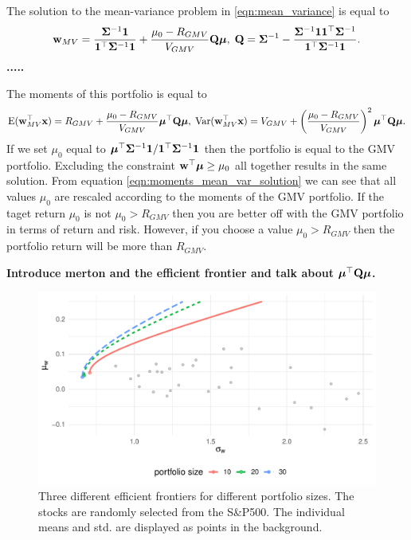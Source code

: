 \documentclass[]{book}\usepackage{knitr}
\begin{document}
The solution to the mean-variance problem in \eqref{eqn:mean_variance} is equal to
\begin{equation}\label{eqn:mean_var_solution}
	\mathbf{w}_{MV} = \frac{\mathbf{\Sigma}^{-1}\mathbf{1}}{\mathbf{1}^\top \mathbf{\Sigma}^{-1}\mathbf{1}} + \frac{\mu_0 - R_{GMV}}{V_{GMV}} \mathbf{Q} \mbox{\boldmath$\mu$},\; \mathbf{Q} = \mathbf{\Sigma}^{-1} - \frac{\mathbf{\Sigma}^{-1} \mathbf{1} \mathbf{1}^\top \mathbf{\Sigma}^{-1}}{\mathbf{1}^\top \mathbf{\Sigma}^{-1} \mathbf{1}}.
\end{equation}
\textbf{.....}

The moments of this portfolio is equal to
\begin{equation}\label{eqn:moments_mean_var_solution}
\operatorname{E}(\mathbf{w}_{MV}^\top\mathbf{x}) = R_{GMV} + \frac{\mu_0 - R_{GMV}}{V_{GMV}} \mbox{\boldmath$\mu$}^\top \mathbf{Q} \mbox{\boldmath$\mu$}, \;
\operatorname{Var}(\mathbf{w}_{MV}^\top\mathbf{x}) =V_{GMV} + \left(\frac{\mu_0 - R_{GMV}}{V_{GMV}}\right)^2 \mbox{\boldmath$\mu$}^\top \mathbf{Q} \mbox{\boldmath$\mu$}.
\end{equation}
If we set $\mu_0$ equal to $\mbox{\boldmath$\mu$}^\top \mathbf{\Sigma}^{-1} \mathbf{1} / \mathbf{1}^\top \mathbf{\Sigma}^{-1} \mathbf{1}$ then the portfolio is equal to the GMV portfolio. 
Excluding the constraint $\mathbf{w}^\top \mbox{\boldmath$\mu$} \geq \mu_0$ all together results in the same solution.
From equation \eqref{eqn:moments_mean_var_solution} we can see that all values $\mu_0$ are rescaled according to the moments of the GMV portfolio. 
If the taget return $\mu_0$ is not $\mu_0>R_{GMV}$ then you are better off with the GMV portfolio in terms of return and risk.
However, if you choose a value $\mu_0>R_{GMV}$ then the portfolio return will be more than $R_{GMV}$.

\textbf{Introduce merton and the efficient frontier and talk about $\mbox{\boldmath$\mu$}^\top \mathbf{Q} \mbox{\boldmath$\mu$}$.}
\begin{knitrout}
\color{fgcolor}\begin{figure}

{\centering \includegraphics[width=\maxwidth]{figure/mertons_efficient_frontier-1} 

}

\caption[Three different efficient frontiers for different portfolio sizes]{Three different efficient frontiers for different portfolio sizes. The stocks are randomly selected from the S\&P500. The individual means and std. are displayed as points in the background.}\label{fig:mertons_efficient_frontier}
\end{figure}

\end{knitrout}
\end{document}
